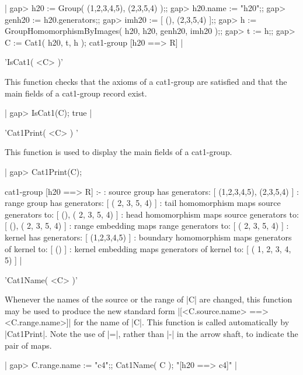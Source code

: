 |    gap> h20 := Group( (1,2,3,4,5), (2,3,5,4) );;
    gap> h20.name := "h20";;
    gap> genh20 := h20.generators;;
    gap> imh20 := [ (), (2,3,5,4) ];;
    gap> h := GroupHomomorphismByImages( h20, h20, genh20, imh20 );;
    gap> t := h;;
    gap> C := Cat1( h20, t, h );
    cat1-group [h20 ==> R]    |
    
%

'IsCat1( <C> )'

This function checks that the axioms of a cat1-group are satisfied and
that the main fields of a cat1-group record exist.

|    gap> IsCat1(C);
    true  |

%

'Cat1Print( <C> ) '

This function is used to display the main fields of a cat1-group.

|    gap> Cat1Print(C);

    cat1-group [h20 ==> R] :- 
    : source group has generators:
      [ (1,2,3,4,5), (2,3,5,4) ]
    : range group has generators:
      [ ( 2, 3, 5, 4) ]
    : tail homomorphism maps source generators to:
      [ (), ( 2, 3, 5, 4) ]
    : head homomorphism maps source generators to:
      [ (), ( 2, 3, 5, 4) ]
    : range embedding maps range generators to:
      [ ( 2, 3, 5, 4) ]
    : kernel has generators:
      [ (1,2,3,4,5) ]
    : boundary homomorphism maps generators of kernel to:
      [ () ]
    : kernel embedding maps generators of kernel to:
      [ ( 1, 2, 3, 4, 5) ]   |

%

'Cat1Name( <C> )'   

Whenever the names of the source or the range of |C| are changed,
this function may be used to produce the new standard form
|[<C.source.name> ==> <C.range.name>]| for the name of |C|.
This function is called automatically by |Cat1Print|.
Note the use of |=|, rather than |-| in the arrow shaft,
to indicate the pair of maps.

|    gap> C.range.name := "c4";; Cat1Name( C ); 
    "[h20 ==> c4]"  | 
    
\newpage

